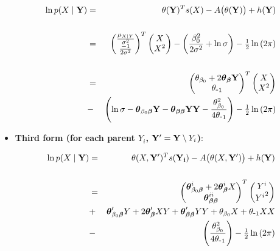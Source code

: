 \documentclass[11pt, oneside]{article}   	%
\DeclareMathOperator*{\E}{\mbox{\large E}}
\numberwithin{figure}{section}
\numberwithin{equation}{section}
\numberwithin{table}{section}
\theoremstyle{definition}
\begin{document}
\begin{appendices}
\begin{itemize}
\begin{eqnarray*}
\ln p(X\mid \mathbf{Y}) &=& \theta(\mathbf{Y})^T s(X) - A \big(\theta(\mathbf{Y})\big) + h(\mathbf{Y})\\\\
&=&
\begin{pmatrix}
\frac{\mu_{X|Y}}{\sigma^2}\\
\frac{-1}{2\sigma^2}\\
\end{pmatrix}^T
\begin{pmatrix}
X\\
X^2\\
\end{pmatrix}
- \left( \frac{\beta_0^2}{2\sigma^2} + \ln{\sigma}\right) - \tfrac{1}{2}\ln{(2\pi)} \\\\
&=&
\begin{pmatrix}
\theta_{\beta_0}+2\boldsymbol \theta_{\boldsymbol \beta} \mathbf Y\\
\theta_{\mbox{-}1}\\
\end{pmatrix}^T
\begin{pmatrix}
X\\
X^2\\
\end{pmatrix}\\
&-& 
\left(\ln{\sigma} - \boldsymbol \theta_{\beta_0\boldsymbol \beta} \mathbf Y - \boldsymbol \theta_{\boldsymbol \beta\boldsymbol \beta}\mathbf Y\mathbf Y -\frac{\theta_{\beta_0}^2}{4\theta_{\mbox{-}1}}\right) - \tfrac{1}{2}\ln{(2\pi)}\\
\end{eqnarray*}



\vspace{0.2in}
\item \textbf{Third form (for each parent $Y_i$, $\mathbf Y' = \mathbf Y \setminus Y_i $)}: 

\begin{eqnarray*}
\ln p(X\mid \mathbf{Y}) &=& \theta(X,\mathbf Y')^T s(\mathbf{Y_i}) - A \big(\theta(X,\mathbf Y') \big) + h(\mathbf{Y})\\\\
&=&
\begin{pmatrix}
\boldsymbol \theta_{\beta_0\boldsymbol \beta}^i + 2\boldsymbol \theta_{\boldsymbol \beta}^iX \\
\boldsymbol \theta_{\boldsymbol \beta\boldsymbol \beta}^{ii} 
\end{pmatrix}^T
\begin{pmatrix}
Y^i\\
{Y^i}^2\\
\end{pmatrix}\\
&+& \boldsymbol \theta_{\beta_0\boldsymbol \beta}'Y + 2\boldsymbol \theta_{\boldsymbol \beta}'XY  + \boldsymbol \theta_{\boldsymbol \beta\boldsymbol \beta}'YY + \theta_{\beta_0}X + \theta_{\mbox{-}1}XX \\
&-& \left( \frac{\theta_{\beta_0}^2}{4\theta_{\mbox{-}1}} \right) - \tfrac{1}{2}\ln{(2\pi)}
\end{eqnarray*}


\end{itemize}
\end{appendices}
\end{document}
